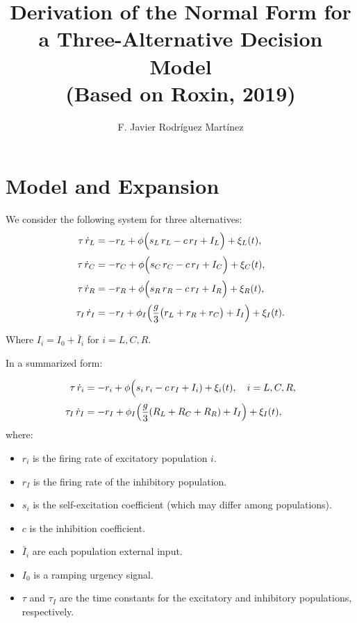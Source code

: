 \documentclass[ENG]{fancynotes}
\title{\vspace{2em}Derivation of the Normal Form for a Three-Alternative Decision Model\\ (Based on Roxin, 2019) }
\author{F. Javier Rodríguez Martínez}
\date{}
\begin{document}
\maketitle

\section{Model and Expansion}

We consider the following system for three alternatives:
\begin{align}
  \tau\,\dot{r}_L &= -r_L + \phi\Bigl(s_L\,r_L - c\,r_I + I_L \Bigr) +\xi_L(t) ,  \label{eq:rL}\\[1mm]
  \tau\,\dot{r}_C &= -r_C + \phi\Bigl(s_C\,r_C - c\,r_I + I_C \Bigr)+\xi_C(t), \label{eq:rC}\\[1mm]
  \tau\,\dot{r}_R &= -r_R + \phi\Bigl(s_R\,r_R - c\,r_I + I_R \Bigr)+\xi_R(t), \label{eq:rR}\\[1mm]
  \tau_I\,\dot{r}_I &= -r_I + \phi_I\Bigl(\frac{g}{3}\bigl(r_L+r_R+r_C\bigr)+I_I\Bigr)+\xi_I(t). \label{eq:rI}
\end{align}

Where $I_i = I_0 + \bar{I}_i$ for $i = L,C,R$. 

In a summarized form:

\begin{align}
  \tau\,\dot{r}_i &= -r_i + \phi\Bigl(s_i\,r_i - c\,r_I + I_i )+\xi_i(t), \quad i=L,C,R, \label{eq:exc}\\[1mm]
  \tau_I\,\dot{r}_I &= -r_I + \phi_I\Bigl(\frac{g}{3}(R_L+R_C+R_R)+I_I\Bigr)+\xi_I(t), \label{eq:inh}
\end{align}
where:
\begin{itemize}
  \item \(r_i\) is the firing rate of excitatory population \(i\).
  \item \(r_I\) is the firing rate of the inhibitory population.
  \item \(s_i\) is the self-excitation coefficient (which may differ among populations).
  \item \(c\) is the inhibition coefficient.
  \item \(\bar{I}_i\) are each population external input.
  \item \(I_0\) is a ramping urgency signal.
  \item \(\tau\) and \(\tau_I\) are the time constants for the excitatory and inhibitory populations, respectively.
\end{itemize}
\end{document}
